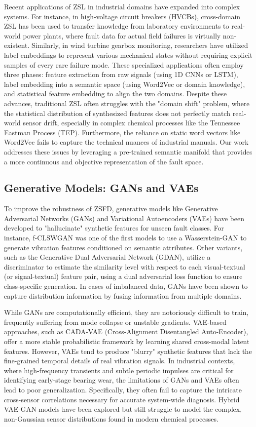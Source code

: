 Recent applications of ZSL in industrial domains have expanded into complex systems. For instance, in high-voltage circuit breakers (HVCBs), cross-domain ZSL has been used to transfer knowledge from laboratory environments to real-world power plants, where fault data for actual field failures is virtually non-existent. Similarly, in wind turbine gearbox monitoring, researchers have utilized label embeddings to represent various mechanical states without requiring explicit samples of every rare failure mode. These specialized applications often employ three phases: feature extraction from raw signals (using 1D CNNs or LSTM), label embedding into a semantic space (using Word2Vec or domain knowledge), and statistical feature embedding to align the two domains. Despite these advances, traditional ZSL often struggles with the "domain shift" problem, where the statistical distribution of synthesized features does not perfectly match real-world sensor drift, especially in complex chemical processes like the Tennessee Eastman Process (TEP). Furthermore, the reliance on static word vectors like Word2Vec fails to capture the technical nuances of industrial manuals. Our work addresses these issues by leveraging a pre-trained semantic manifold that provides a more continuous and objective representation of the fault space.

\subsection{Generative Models: GANs and VAEs}
To improve the robustness of ZSFD, generative models like Generative Adversarial Networks (GANs) and Variational Autoencoders (VAEs) have been developed to "hallucinate" synthetic features for unseen fault classes. For instance, f-CLSWGAN was one of the first models to use a Wasserstein-GAN to generate vibration features conditioned on semantic attributes. Other variants, such as the Generative Dual Adversarial Network (GDAN), utilize a discriminator to estimate the similarity level with respect to each visual-textual (or signal-textual) feature pair, using a dual adversarial loss function to ensure class-specific generation. In cases of imbalanced data, GANs have been shown to capture distribution information by fusing information from multiple domains.

While GANs are computationally efficient, they are notoriously difficult to train, frequently suffering from mode collapse or unstable gradients. VAE-based approaches, such as CADA-VAE (Cross-Alignment Disentangled Auto-Encoder), offer a more stable probabilistic framework by learning shared cross-modal latent features. However, VAEs tend to produce "blurry" synthetic features that lack the fine-grained temporal details of real vibration signals. In industrial contexts, where high-frequency transients and subtle periodic impulses are critical for identifying early-stage bearing wear, the limitations of GANs and VAEs often lead to poor generalization. Specifically, they often fail to capture the intricate cross-sensor correlations necessary for accurate system-wide diagnosis. Hybrid VAE-GAN models have been explored but still struggle to model the complex, non-Gaussian sensor distributions found in modern chemical processes.

